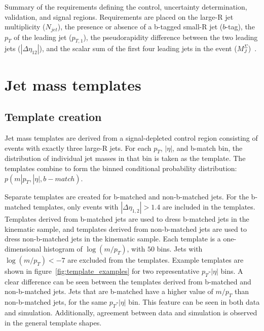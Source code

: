 \begin{table}
    \caption{Summary of the requirements defining the control, uncertainty determination, validation, and signal regions.
    Requirements are placed on the large-R jet multiplicity ($N_{jet}$), the presence or absence of a b-tagged small-R jet ($b$-tag),
    the $p_T$ of the leading jet ($p_{T,1}$), the pseudorapidity difference between the two leading jets ($|\Delta\eta_{12}|$),
    and the scalar sum of the first four leading jets in the event ($M_J^{\Sigma}$)~\cite{paper-plb}.}
    \label{tbl:region_defs}

\end{table}

\section{Jet mass templates}\label{sec:jet_mass_templates}

\subsection{Template creation}\label{subsec:template_creation}

Jet mass templates are derived from a signal-depleted control region consisting of events with exactly three large-R jets.
For each $p_T$, $|\eta|$, and b-match bin, the distribution of individual jet masses in that bin is taken as the template.
The templates combine to form the binned conditional probability distribution: $p(m|p_{T}, |\eta|, b-match)$.

Separate templates are created for b-matched and non-b-matched jets.
For the b-matched templates, only events with $|\Delta \eta_{1,2}| > 1.4$ are included in the templates.
Templates derived from b-matched jets are used to dress b-matched jets in the kinematic sample,
and templates derived from non-b-matched jets are used to dress non-b-matched jets in the kinematic sample.
Each template is a one-dimensional histogram of $\log\left(m/p_{T}\right)$, with $50$ bins.
Jets with $\log\left(m/p_{T}\right)< -7$ are excluded from the templates.
Example templates are shown in figure~\ref{fig:template_examples} for two representative $p_{T}$-$|\eta|$ bins.
A clear difference can be seen between the templates derived from b-matched and non-b-matched jets.
Jets that are b-matched have a higher value of $m/p_{T}$ than non-b-matched jets, for the same  $p_{T}$-$|\eta|$ bin.
This feature can be seen in both data and simulation.
Additionally, agreement between data and simulation is observed in the general template shapes.

